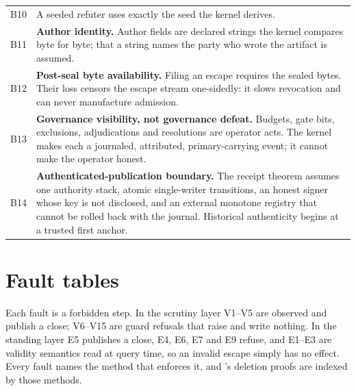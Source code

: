 \documentclass[11pt,a4paper]{article}
\theoremstyle{plain}
\theoremstyle{definition}
\theoremstyle{remark}
\begin{document}
\begin{longtable}{@{}p{}p{}@{}}
B10 & A seeded refuter uses exactly the seed the kernel derives. \\
B11 & \textbf{Author identity.} Author fields are declared strings the kernel compares byte for byte; that a string names the party who wrote the artifact is assumed. \\
B12 & \textbf{Post-seal byte availability.} Filing an escape requires the sealed bytes. Their loss censors the escape stream one-sidedly: it slows revocation and can never manufacture admission. \\
B13 & \textbf{Governance visibility, not governance defeat.} Budgets, gate bits, exclusions, adjudications and resolutions are operator acts. The kernel makes each a journaled, attributed, primary-carrying event; it cannot make the operator honest. \\
B14 & \textbf{Authenticated-publication boundary.} The receipt theorem assumes one authority stack, atomic single-writer transitions, an honest signer whose key is not disclosed, and an external monotone registry that cannot be rolled back with the journal. Historical authenticity begins at a trusted first anchor. \\
\bottomrule
\end{longtable}

\section{Fault tables}
\label{app:faults}

Each fault is a forbidden step. In the scrutiny layer V1--V5 are observed and publish a close; V6--V15 are guard refusals that raise and write nothing. In the standing layer E5 publishes a close, E4, E6, E7 and E9 refuse, and E1--E3 are validity semantics read at query time, so an invalid escape simply has no effect. Every fault names the method that enforces it, and 's deletion proofs are indexed by those methods.
\end{document}
